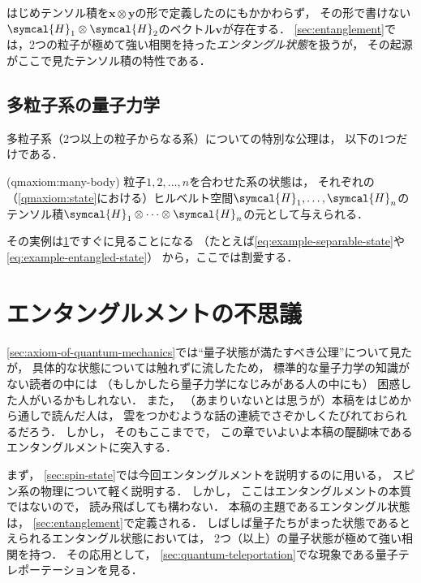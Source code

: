 \documentclass[
]{sotsu}
\begin{document}
\vspace{\baselineskip}


はじめテンソル積を$\symbf{x} \otimes \symbf{y}$の形で定義したのにもかかわらず，
その形で書けない$\symcal{H}_1 \otimes \symcal{H}_2$のベクトル$\symbf{v}$が存在する．
\cref{sec:entanglement}では，2つの粒子が極めて強い相関を持った\emph{エンタングル状態}を扱うが，
その起源がここで見たテンソル積の特性である．





\subsection{多粒子系の量子力学}
\label{sec:quantum-axiom-of-many-body}

多粒子系（2つ以上の粒子からなる系）についての特別な公理は，
以下の1つだけである．


\begin{qmaxiom}[多粒子系](qmaxiom:many-body)
    粒子$1, 2, \dots, n$を合わせた系の状態は，
    それぞれの（\cref{qmaxiom:state}における）ヒルベルト空間$\symcal{H}_1, \dots, \symcal{H}_n$のテンソル積$\symcal{H}_1 \otimes \dotsb \otimes \symcal{H}_n$の元として与えられる．
\end{qmaxiom}


その実例は\cref{sec:misterious-entanglement}ですぐに見ることになる
（たとえば\cref{eq:example-separable-state}や\cref{eq:example-entangled-state}）
から，ここでは割愛する．





\section{エンタングルメントの不思議}
\label{sec:misterious-entanglement}

\cref{sec:axiom-of-quantum-mechanics}では``量子状態が満たすべき公理''について見たが，
具体的な状態については触れずに流したため，
標準的な量子力学の知識がない読者の中には
（もしかしたら量子力学になじみがある人の中にも）
困惑した人がいるかもしれない．
また，
（あまりいないとは思うが）本稿をはじめから通しで読んだ人は，
雲をつかむような話の連続でさぞかしくたびれておられるだろう．
しかし，
そのもここまでで，
この章でいよいよ本稿の醍醐味であるエンタングルメントに突入する．

まず，
\cref{sec:spin-state}では今回エンタングルメントを説明するのに用いる，
スピン系の物理について軽く説明する．
しかし，
ここはエンタングルメントの本質ではないので，
読み飛ばしても構わない．
本稿の主題であるエンタングル状態は，
\cref{sec:entanglement}で定義される．
しばしば量子たちがまった状態であるとえられるエンタングル状態においては，
2つ（以上）の量子状態が極めて強い相関を持つ．
その応用として，
\cref{sec:quantum-teleportation}でな現象である量子テレポーテーションを見る．
\end{document}
